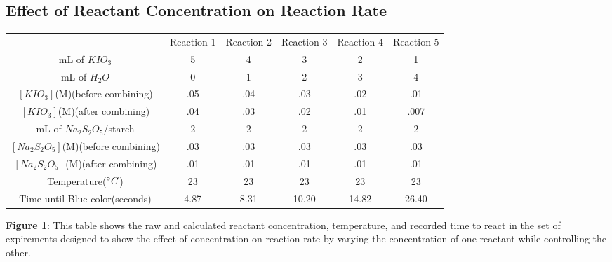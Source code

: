 \documentclass{article}
\begin{document}
\subsection{Effect of Reactant Concentration on Reaction Rate}
\begin{table}[H]
    \begin{center}
    \begin{tabularx}{400pt}{c|c|c|c|c|c} & Reaction 1 & Reaction 2 & Reaction 3 & Reaction 4 & Reaction 5  \\
    mL of $KIO_3$ & 5 & 4 & 3 & 2 & 1 \\
    mL of $H_2O$ & 0 & 1 & 2 & 3 & 4 \\
    $[KIO_3]$(M)(before combining) & .05 & .04 & .03 & .02 & .01 \\
    $[KIO_3]$(M)(after combining) & .04 & .03 & .02 & .01 & .007 \\
    mL of $Na_2S_2O_5$/starch & 2 & 2 & 2 & 2 & 2 \\
    $[Na_2S_2O_5]$(M)(before combining) & .03 & .03 & .03 & .03 & .03 \\
    $[Na_2S_2O_5]$(M)(after combining) & .01 & .01 & .01 & .01 & .01 \\
    Temperature($\degree C$) & 23 & 23 & 23 & 23 & 23 \\
    Time until Blue color(seconds) & 4.87 & 8.31 & 10.20 & 14.82 & 26.40 \\

    \end{tabularx}
    \end{center}
\end{table}
\textbf{Figure 1}: This table shows the raw and calculated reactant concentration, temperature, and recorded time to react in the set of expirements designed to show the effect of concentration on reaction rate by varying the concentration of one reactant while controlling the other.
\end{document}
